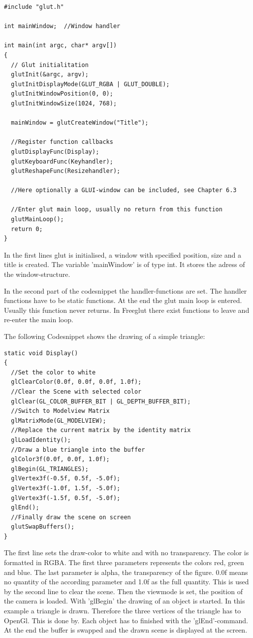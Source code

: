 \documentclass[10pt,a4paper,DIV=11]{scrreprt}
\begin{document}
\begin{lstlisting}[caption={Initialization a GLUT-program},label=lst:glut-init]
#include "glut.h"

int mainWindow;  //Window handler

int main(int argc, char* argv[])
{
  // Glut initialitation
  glutInit(&argc, argv);
  glutInitDisplayMode(GLUT_RGBA | GLUT_DOUBLE);
  glutInitWindowPosition(0, 0); 
  glutInitWindowSize(1024, 768);
  
  mainWindow = glutCreateWindow("Title");
  
  //Register function callbacks
  glutDisplayFunc(Display);
  glutKeyboardFunc(Keyhandler);
  glutReshapeFunc(Resizehandler);
  
  //Here optionally a GLUI-window can be included, see Chapter 6.3
  
  //Enter glut main loop, usually no return from this function
  glutMainLoop(); 
  return 0;
}
\end{lstlisting}

In the first lines glut is initialised, a window with specified position, size and a title is created.
The variable 'mainWindow' is of type int. It stores the adress of the window-structure.

In the second part of the codesnippet the handler-functions are set. The handler functions have to be static functions.
At the end the glut main loop is entered. Usually this function never returns. In Freeglut there exist functions to leave and re-enter the main loop.

The following Codesnippet shows the drawing of a simple triangle:

\begin{lstlisting}[caption={Drawing some graphics},label=lst:glut-draw]
static void Display()
{
  //Set the color to white
  glClearColor(0.0f, 0.0f, 0.0f, 1.0f);
  //Clear the Scene with selected color
  glClear(GL_COLOR_BUFFER_BIT | GL_DEPTH_BUFFER_BIT);
  //Switch to Modelview Matrix
  glMatrixMode(GL_MODELVIEW);
  //Replace the current matrix by the identity matrix
  glLoadIdentity();
  //Draw a blue triangle into the buffer
  glColor3f(0.0f, 0.0f, 1.0f);
  glBegin(GL_TRIANGLES);
  glVertex3f(-0.5f, 0.5f, -5.0f);
  glVertex3f(-1.0f, 1.5f, -5.0f);
  glVertex3f(-1.5f, 0.5f, -5.0f);
  glEnd();
  //Finally draw the scene on screen
  glutSwapBuffers();
}
\end{lstlisting}

The first line sets the draw-color to white and with no transparency. The color is formatted in RGBA. The first three parameters represents the colors red, green and blue. The last parameter is alpha, the transparency of the figure. 0.0f means no quantity of the according parameter and 1.0f as the full quantity.
 This is used by the second line to clear the scene.
Then the viewmode is set, the position of the camera is loaded.
With 'glBegin' the drawing of an object is started. In this example a triangle is drawn. Therefore the three vertices of the triangle has to OpenGl. This is done by. Each object has to finished with the 'glEnd'-command.
At the end the buffer is swapped and the drawn scene is displayed at the screen.
\end{document}
